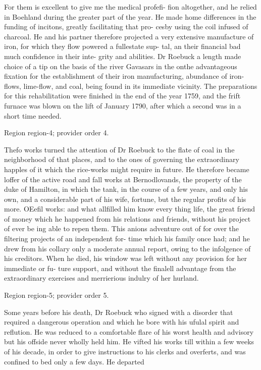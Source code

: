 \documentclass[11pt]{article}
\begin{document}
For them is excellent to give me the medical profefi- fion altogether, and he relied in Boehland during the greater part of the year. He made home differences in the funding of incitons, greatly facilitating that pro- cesby using the coil infused of charcoal. He and his partner therefore projected a very extensive manufacture of iron, for which they flow powered a fullestate sup- tal, an their financial bad much confidence in their inte- grity and abilities. Dr Roebuck a length made choice of a tip on the basis of the river Gavasars in the onthe advantageous fixation for the establishment of their iron manufacturing, abundance of iron-flows, lime-flow, and coal, being found in its immediate vicinity. The preparations for this rehabilitation were finished in the end of the year 1759, and the frift furnace was blown on the lift of January 1790, after which a second was in a short time needed.
\par

{\scriptsize\color{gray} Region region-4; provider order 4.\par}
\medskip

Thefo works turned the attention of Dr Roebuck to the flate of coal in the neighborhood of that places, and to the ones of governing the extraordinary happles of it which the rice-works might require in future. He therefore became loffer of the active road and fall works at Bernodlovands, the property of the duke of Hamilton, in which the tank, in the course of a few years, and only his own, and a considerable part of his wife, fortune, but the regular profits of his more. OEefil works: and what allfilled him know every thing life, the great friend of money which he happened from his relations and friends, without his project of ever be ing able to repen them. This anions adventure out of for over the filtering projects of an independent for- time which his family once had; and he drew from his collary only a moderate annual report, owing to the infolgence of his creditors. When he died, his window was left without any provision for her immediate or fu- ture support, and without the finalell advantage from the extraordinary exercises and merrierious indulry of her hurland.
\par

{\scriptsize\color{gray} Region region-5; provider order 5.\par}
\medskip

Some years before his death, Dr Roebuck who signed with a disorder that required a dangerous operation and which he bore with his ufulal spirit and reflution. He was reduced to a comfortable flare of his worst health and advisory but his offside never wholly held him. He vifted his works till within a few weeks of his decade, in order to give instructions to his clerks and overferts, and was confined to bed only a few days. He departed
\par
\end{document}
